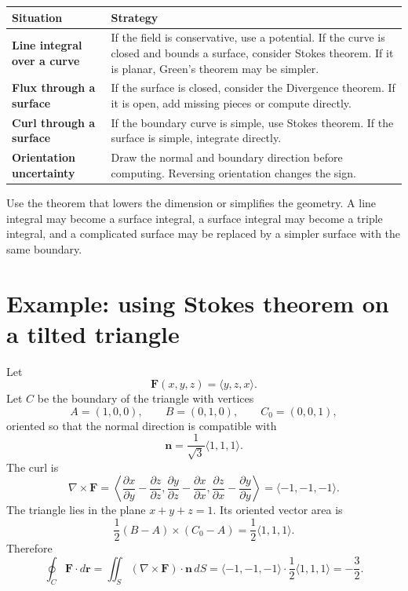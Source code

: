 \documentclass[11pt]{article}
\newcommand{\vr}{\mathbf r}
\newcommand{\vn}{\mathbf n}
\newcommand{\vF}{\mathbf F}
\begin{document}
\begin{center}
\begin{tabularx}{\textwidth}{>{\bfseries}lX}
\toprule
Situation & Strategy\\
\midrule
Line integral over a curve & If the field is conservative, use a potential. If the curve is closed and bounds a surface, consider Stokes theorem. If it is planar, Green's theorem may be simpler.\\
Flux through a surface & If the surface is closed, consider the Divergence theorem. If it is open, add missing pieces or compute directly.\\
Curl through a surface & If the boundary curve is simple, use Stokes theorem. If the surface is simple, integrate directly.\\
Orientation uncertainty & Draw the normal and boundary direction before computing. Reversing orientation changes the sign.\\
\bottomrule
\end{tabularx}
\end{center}

\begin{tipbox}
Use the theorem that lowers the dimension or simplifies the geometry. A line integral may become a surface integral, a surface integral may become a triple integral, and a complicated surface may be replaced by a simpler surface with the same boundary.
\end{tipbox}

\section{Example: using Stokes theorem on a tilted triangle}

\begin{examplebox}
Let
\[
\vF(x,y,z)=\langle y,z,x\rangle.
\]
Let $C$ be the boundary of the triangle with vertices
\[
A=(1,0,0),\qquad B=(0,1,0),\qquad C_0=(0,0,1),
\]
oriented so that the normal direction is compatible with
\[
\vn=\frac{1}{\sqrt3}\langle1,1,1\rangle.
\]
The curl is
\[
\nabla\times\vF
=\left\langle
\frac{\partial x}{\partial y}-\frac{\partial z}{\partial z},
\frac{\partial y}{\partial z}-\frac{\partial x}{\partial x},
\frac{\partial z}{\partial x}-\frac{\partial y}{\partial y}
\right\rangle
=\langle-1,-1,-1\rangle.
\]
The triangle lies in the plane $x+y+z=1$. Its oriented vector area is
\[
\frac12(B-A)\times(C_0-A)=\frac12\langle1,1,1\rangle.
\]
Therefore
\[
\oint_C\vF\cdot d\vr
=
\iint_S(\nabla\times\vF)\cdot\vn\,dS
=
\langle-1,-1,-1\rangle\cdot\frac12\langle1,1,1\rangle
=-\frac32.
\]
\end{examplebox}
\end{document}
